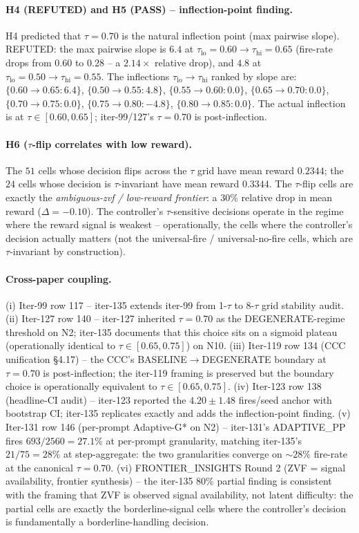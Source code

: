 \documentclass{article}
\begin{document}
\paragraph{H4 (REFUTED) and H5 (PASS) -- inflection-point finding.}
H4 predicted that $\tau=0.70$ is the natural inflection point (max
pairwise slope). REFUTED: the max pairwise slope is $6.4$ at
$\tau_\mathrm{lo}=0.60 \to \tau_\mathrm{hi}=0.65$ (fire-rate drops from
$0.60$ to $0.28$ -- a $2.14\times$ relative drop), and $4.8$ at
$\tau_\mathrm{lo}=0.50 \to \tau_\mathrm{hi}=0.55$. The inflections
$\tau_\mathrm{lo} \to \tau_\mathrm{hi}$ ranked by slope are:
$\{0.60\to0.65: 6.4\}$, $\{0.50\to0.55: 4.8\}$, $\{0.55\to0.60: 0.0\}$,
$\{0.65\to0.70: 0.0\}$, $\{0.70\to0.75: 0.0\}$, $\{0.75\to0.80: -4.8\}$,
$\{0.80\to0.85: 0.0\}$. The actual inflection is at $\tau \in [0.60, 0.65]$;
iter-99/127's $\tau=0.70$ is post-inflection.

\paragraph{H6 ($\tau$-flip correlates with low reward).}
The $51$ cells whose decision flips across the $\tau$ grid have mean
reward $0.2344$; the $24$ cells whose decision is $\tau$-invariant have
mean reward $0.3344$. The $\tau$-flip cells are exactly the
\emph{ambiguous-zvf / low-reward frontier}: a $30\%$ relative drop in
mean reward ($\Delta = -0.10$). The controller's $\tau$-sensitive
decisions operate in the regime where the reward signal is weakest --
operationally, the cells where the controller's decision actually
matters (not the universal-fire / universal-no-fire cells, which are
$\tau$-invariant by construction).

\paragraph{Cross-paper coupling.}
(i) Iter-99 row 117 -- iter-135 extends iter-99 from 1-$\tau$ to 8-$\tau$
grid stability audit. (ii) Iter-127 row 140 -- iter-127 inherited
$\tau=0.70$ as the DEGENERATE-regime threshold on N2; iter-135
documents that this choice sits on a sigmoid plateau (operationally
identical to $\tau \in [0.65, 0.75]$) on N10. (iii) Iter-119 row 134
(CCC unification §4.17) -- the CCC's BASELINE$\to$DEGENERATE boundary at
$\tau=0.70$ is post-inflection; the iter-119 framing is preserved but
the boundary choice is operationally equivalent to $\tau \in [0.65, 0.75]$.
(iv) Iter-123 row 138 (headline-CI audit) -- iter-123 reported the
$4.20 \pm 1.48$ fires/seed anchor with bootstrap CI; iter-135 replicates
exactly and adds the inflection-point finding. (v) Iter-131 row 146
(per-prompt Adaptive-G* on N2) -- iter-131's ADAPTIVE\_PP fires
$693/2560 = 27.1\%$ at per-prompt granularity, matching iter-135's
$21/75 = 28\%$ at step-aggregate: the two granularities converge on
$\sim 28\%$ fire-rate at the canonical $\tau=0.70$.
(vi) FRONTIER\_INSIGHTS Round 2 (ZVF = signal availability,
frontier synthesis) -- the iter-135 80\% partial finding is consistent
with the framing that ZVF is observed signal availability, not latent
difficulty: the partial cells are exactly the borderline-signal cells
where the controller's decision is fundamentally a borderline-handling
decision.
\end{document}
